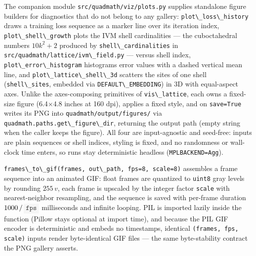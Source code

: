 \documentclass[
  10pt,
]{article}
\newcommand{\passthrough}[1]{#1}
\renewcommand{\texttt}[1]{%
    \colorbox{codebg}{\color{codefg}\ttfamily #1}%
}
\begin{document}
The companion module \passthrough{\lstinline!src/quadmath/viz/plots.py!}
supplies standalone figure builders for diagnostics that do not belong
to any gallery: \passthrough{\lstinline!plot\_loss\_history!} draws a
training loss sequence as a marker line over its iteration index,
\passthrough{\lstinline!plot\_shell\_growth!} plots the IVM shell
cardinalities --- the cuboctahedral numbers \(10k^2+2\) produced by
\passthrough{\lstinline!shell\_cardinalities!} in
\passthrough{\lstinline!src/quadmath/lattice/ivm\_field.py!} --- versus
shell index, \passthrough{\lstinline!plot\_error\_histogram!} histograms
error values with a dashed vertical mean line, and
\passthrough{\lstinline!plot\_lattice\_shell\_3d!} scatters the sites of
one shell (\passthrough{\lstinline!shell\_sites!}, embedded via
\passthrough{\lstinline!DEFAULT\_EMBEDDING!}) in 3D with equal-aspect
axes. Unlike the axes-composing primitives of
\passthrough{\lstinline!vis\_lattice!}, each owns a fixed-size figure
(6.4×4.8 inches at 160 dpi), applies a fixed style, and on
\passthrough{\lstinline!save=True!} writes its PNG into
\passthrough{\lstinline!quadmath/output/figures/!} via
\passthrough{\lstinline!quadmath.paths.get\_figure\_dir!}, returning the
output path (empty string when the caller keeps the figure). All four
are input-agnostic and seed-free: inputs are plain sequences or shell
indices, styling is fixed, and no randomness or wall-clock time enters,
so runs stay deterministic headless
(\passthrough{\lstinline!MPLBACKEND=Agg!}).

\passthrough{\lstinline!frames\_to\_gif(frames, out\_path, fps=8, scale=8)!}
assembles a frame sequence into an animated GIF: float frames are
quantized to \passthrough{\lstinline!uint8!} gray levels by rounding
\(255\,v\), each frame is upscaled by the integer factor
\passthrough{\lstinline!scale!} with nearest-neighbor resampling, and
the sequence is saved with per-frame duration \(1000\,/\,\texttt{fps}\)
milliseconds and infinite looping. PIL is imported lazily inside the
function (Pillow stays optional at import time), and because the PIL GIF
encoder is deterministic and embeds no timestamps, identical
\passthrough{\lstinline!(frames, fps, scale)!} inputs render
byte-identical GIF files --- the same byte-stability contract the PNG
gallery asserts.
\end{document}

